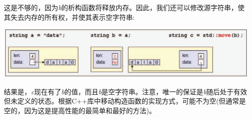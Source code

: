 这是不够的，因为\textit{b}的析构函数将释放内存。因此，我们还可以修改源字符串，使其失去内存的所有权，并使其表示空字符串:\par

\begin{center}
	\includegraphics[width=1.0\textwidth]{content/1/chapter1/images/22}
\end{center}

结果是，\textit{c}现在有了\textit{b}的值，而且\textit{b}是空字符串。注意，唯一的保证是\textit{b}随后处于有效但未定义的状态。根据C++库中移动构造函数的实现方式，可能不为空(但通常是空的，因为这是提高性能的最简单和最好的方法)。\par


















